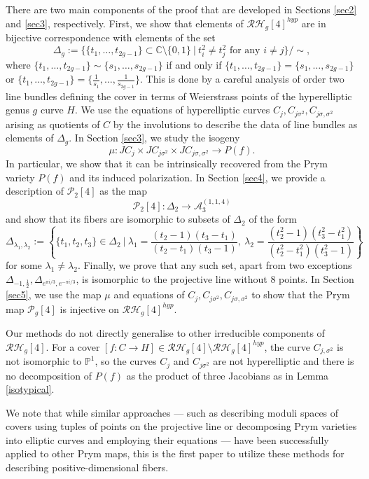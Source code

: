 \documentclass{article}
\numberwithin{equation}{section}
\newcommand{\s}{\sigma}
\begin{document}
There are two main components of the proof that are developed in Sections \ref{sec2} and \ref{sec3}, respectively. First, we show that elements of $\mathcal{RH}_g[4]^{hyp}$ are in bijective correspondence with elements of the set $$\Delta_g := \{\{t_1,\ldots, t_{2g-1}\} \subset \mathbb{C}\setminus \{0,1\} \ | \ t_i^2 \neq t_j^2 \text{ for any } i\neq j\}/\sim,$$ where \(\{t_1, \ldots, t_{2g-1}\} \sim \{s_1, \ldots, s_{2g-1}\}\) if and only if $\{t_1,\ldots, t_{2g-1}\} = \{s_1, \ldots, s_{2g-1}\}$ or $\{t_1, \ldots, t_{2g-1}\} = \{\frac{1}{s_1}, \ldots, \frac{1}{s_{2g-1}}\}$. This is done by a careful analysis of order two line bundles defining the cover in terms of Weierstrass points of the hyperelliptic genus $g$ curve $H$. We use the equations of hyperelliptic curves $C_j, C_{j\sigma^2}, C_{j\s, \s^2}$ arising as quotients of $C$ by the involutions to describe the data of line bundles as elements of $\Delta_g$. In Section \ref{sec3}, we study the isogeny $$\mu: JC_j \times JC_{j\sigma^2} \times JC_{j\s,\s^2} \to P(f).$$ In particular, we show that it can be intrinsically recovered from the Prym variety $P(f)$ and its induced polarization. In Section \ref{sec4}, we provide a description of $\mathcal{P}_2[4]$ as the map $$\mathcal{P}_2[4]: \Delta_2 \to \mathcal{A}_3^{(1,1,4)}$$ and show that its fibers are isomorphic to subsets of $\Delta_2$ of the form $$\Delta_{\lambda_1,\lambda_2} := \left\{\{t_1, t_2, t_3\} \in \Delta_2 \: | \: \lambda_1 = \frac{(t_2 - 1)(t_3 - t_1)}{(t_2 - t_1)(t_3 - 1)}, \: \lambda_2 = \frac{(t_2^2 - 1)(t_3^2 - t_1^2)}{(t_2^2 - t_1^2)(t_3^2 - 1)}\right\}$$ for some $\lambda_1 \neq \lambda_2$. Finally, we prove that any such set, apart from two exceptions $\Delta_{-1, \frac{1}{2}}, \Delta_{e^{\pi i /3}, e^{-\pi i /3}}$, is isomorphic to the projective line without 8 points. In Section \ref{sec5}, we use the map $\mu$ and equations of $C_j, C_{j\s^2}, C_{j\s,\s^2}$ to show that the Prym map $\mathcal{P}_g[4]$ is injective on $\mathcal{RH}_g[4]^{hyp}$.

Our methods do not directly generalise to other irreducible components of $\mathcal{RH}_g[4]$. For a cover $[f:C \to H] \in  \mathcal{RH}_g[4] \setminus \mathcal{RH}_g[4]^{hyp}$, the curve $C_{j,\s^2}$ is not isomorphic to $\mathbb{P}^1$, so the curves $C_{j}$ and $C_{j\s^2}$ are not hyperelliptic and there is no decomposition of $P(f)$ as the product of three Jacobians as in Lemma \ref{isotypical}.

We note that while similar approaches --- such as describing moduli spaces of covers using tuples of points on the projective line \cite{MR4068284} or decomposing Prym varieties into elliptic curves and employing their equations \cite{MR4794691} --- have been successfully applied to other Prym maps, this is the first paper to utilize these methods for describing positive-dimensional fibers. 
\end{document}
